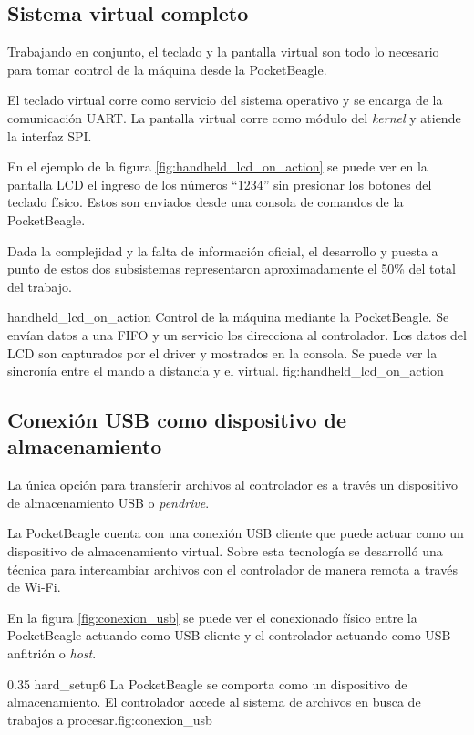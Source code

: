 \subsection{Sistema virtual completo}
      Trabajando en conjunto, el teclado y la pantalla virtual son todo lo necesario para tomar control de la máquina desde la PocketBeagle.\par
      El teclado virtual corre como servicio del sistema operativo y se encarga de la comunicación UART. La pantalla virtual corre como módulo del \textit{kernel} y atiende la interfaz SPI.\par

      En el ejemplo de la figura \ref{fig:handheld_lcd_on_action} se puede ver en la pantalla LCD el ingreso de los números ``1234'' sin presionar los botones del teclado físico. Estos son enviados desde una consola de comandos de la PocketBeagle.\par
      Dada la complejidad y la falta de información oficial, el desarrollo y puesta a punto de estos dos subsistemas representaron aproximadamente el 50\% del total del trabajo.\par

         {handheld_lcd_on_action}
         {Control de la máquina mediante la PocketBeagle. Se envían datos a una FIFO y un servicio los direcciona al controlador. Los datos del LCD son capturados por el driver y mostrados en la consola. Se puede ver la sincronía entre el mando a distancia y el virtual.}
         {fig:handheld_lcd_on_action}


\subsection{Conexión USB como dispositivo de almacenamiento}
La única opción para transferir archivos al controlador es a través un dispositivo de almacenamiento USB o \textit{pendrive}.\par
   La PocketBeagle cuenta con una conexión USB cliente que puede actuar como un dispositivo de almacenamiento virtual.
   Sobre esta tecnología se desarrolló una técnica para intercambiar archivos con el controlador de manera remota a través de Wi-Fi.\par
   En la figura \ref{fig:conexion_usb} se puede ver el conexionado físico entre la PocketBeagle actuando como USB cliente y el controlador actuando como USB anfitrión o \textit{host}.

\subfiga 
   {0.35} {hard_setup6} {La PocketBeagle se comporta como un dispositivo de almacenamiento. El controlador accede al sistema de archivos en busca de trabajos a procesar.}{fig:conexion_usb}


